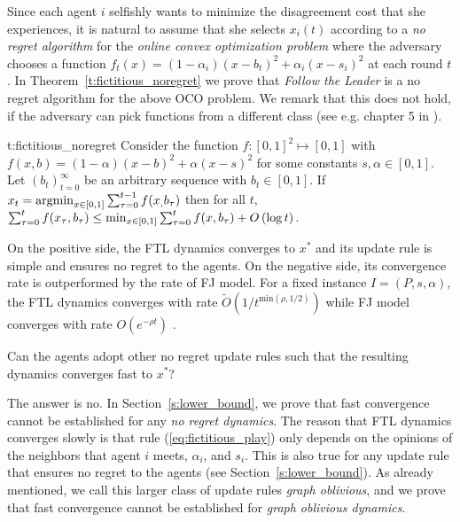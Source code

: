 Since each agent $i$ selfishly wants to minimize the disagreement cost
that she experiences, it is natural to assume that she selects $x_i(t)$ according to
a \emph{no regret algorithm} for the \emph{online convex optimization problem}
where the adversary chooses a function $f_t(x)=(1-\alpha_i)(x-b_t)^2 + \alpha_i(x-s_i)^2$
at each round $t$. In Theorem~\ref{t:fictitious_noregret}
we prove that \emph{Follow the Leader} is a no regret algorithm
for the above OCO problem. We remark that this does not hold,
if the adversary can pick functions from a different class
(see e.g. chapter 5 in \cite{Haz16}).

\begin{reptheorem}{t:fictitious_noregret}
  Consider the function $f:[0,1]^2 \mapsto [0,1]$ with
  $f(x,b) = (1-\alpha)(x-b)^2 + \alpha(x-s)^2$ for some
  constants $s,\alpha \in [0,1]$.
  Let $(b_t)_{t=0}^\infty$ be an arbitrary sequence with
  $b_t \in [0,1]$. If $x_t = \operatorname*{argmin}_{x \in [0,1]}\sum_{\tau=0}^{t-1}f(x_,b_\tau)$
  then for all $t$,
  \(
    \sum_{\tau=0}^{t}f(x_\tau,b_\tau) \leq
    \min_{x \in [0,1]}\sum_{\tau=0}^tf(x,b_\tau) + O\left(\log t\right).
  \)
\end{reptheorem}

On the positive side, the FTL dynamics converges to $x^*$ and its
update rule is simple and ensures no regret to the agents.
On the negative side, its convergence rate is outperformed by the rate of FJ
model.  For a fixed instance $I=(P,s,\alpha)$, the FTL dynamics converges with
rate $\widetilde{O}(1/t^{\text{min}(\rho,1/2)})$ while FJ model
converges with rate $O(e^{-\rho t})$ \cite{GS14}.

\begin{question}
  Can the agents adopt other no regret update rules such that the resulting
  dynamics converges fast to $x^*$?
\end{question}

The answer is no. In Section~\ref{s:lower_bound}, we prove that fast convergence cannot be established 
for any \emph{no regret dynamics}.
The reason that FTL dynamics converges slowly is that
 rule (\ref{eq:fictitious_play})
only depends on the opinions of the neighbors that agent $i$ meets,
$\alpha_i$, and $s_i$. This is also true for any update rule that
ensures no regret to the agents (see Section~\ref{s:lower_bound}).
As already mentioned, we call this larger class
of update rules \emph{graph oblivious}, and we prove that fast convergence
cannot be established for \emph{graph oblivious dynamics}.

